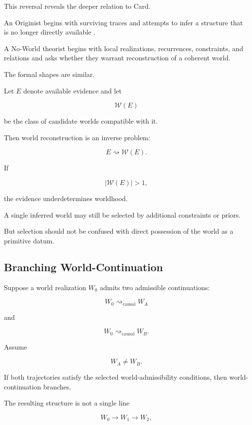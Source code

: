 \documentclass[
  11pt,
  a4paper,
  DIV=12,
  BCOR=0mm,
  parskip=half-
]{scrartcl}
\newcommand{\leadcausal}{%
  \mathrel{\rightsquigarrow_{\mathrm{causal}}}%
}
\theoremstyle{definition}
\theoremstyle{plain}
\theoremstyle{remark}
\begin{document}
This reversal reveals the deeper relation to Card.

An Originist begins with surviving traces and attempts to infer a structure
that is no longer directly available \cite{card1989}.

A No-World theorist begins with local realizations, recurrences, constraints,
and relations and asks whether they warrant reconstruction of a coherent
world.

The formal shapes are similar.

Let \(E\) denote available evidence and let

\[
  \mathcal W(E)
\]

be the class of candidate worlds compatible with it.

Then world reconstruction is an inverse problem:

\[
  E
  \rightsquigarrow
  \mathcal W(E).
\]

If

\[
  |\mathcal W(E)|>1,
\]

the evidence underdetermines worldhood.

A single inferred world may still be selected by additional constraints or
priors.

But selection should not be confused with direct possession of the world as a
primitive datum.


\subsection{Branching World-Continuation}
\label{app:branching-worlds}

Suppose a world realization \(W_0\) admits two admissible continuations:

\[
  W_0
  \leadcausal
  W_A
\]

and

\[
  W_0
  \leadcausal
  W_B.
\]

Assume

\[
  W_A\neq W_B.
\]

If both trajectories satisfy the selected world-admissibility conditions, then
world-continuation branches.

The resulting structure is not a single line

\[
  W_0\to W_1\to W_2,
\]
\end{document}
